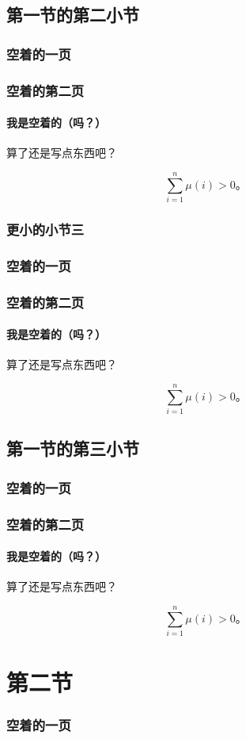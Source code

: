 \documentclass{../pkslide}
\begin{document}
\subsection{第一节的第二小节}

\begin{frame}
  \frametitle{空着的一页}
\end{frame}

\begin{frame}
  \frametitle{空着的第二页}
  \framesubtitle{我是空着的（吗？）}
  
  算了还是写点东西吧？
  
  \[ \sum_{i = 1}^{n} \mu(i) > 0 \text{。} \]
\end{frame}

\subsubsection{更小的小节三}

\begin{frame}
  \frametitle{空着的一页}
\end{frame}

\begin{frame}
  \frametitle{空着的第二页}
  \framesubtitle{我是空着的（吗？）}
  
  算了还是写点东西吧？
  
  \[ \sum_{i = 1}^{n} \mu(i) > 0 \text{。} \]
\end{frame}

\subsection{第一节的第三小节}

\begin{frame}
  \frametitle{空着的一页}
\end{frame}

\begin{frame}
  \frametitle{空着的第二页}
  \framesubtitle{我是空着的（吗？）}
  
  算了还是写点东西吧？
  
  \[ \sum_{i = 1}^{n} \mu(i) > 0 \text{。} \]
\end{frame}

\section{第二节}

\begin{frame}
  \frametitle{空着的一页}
\end{frame}
\end{document}
